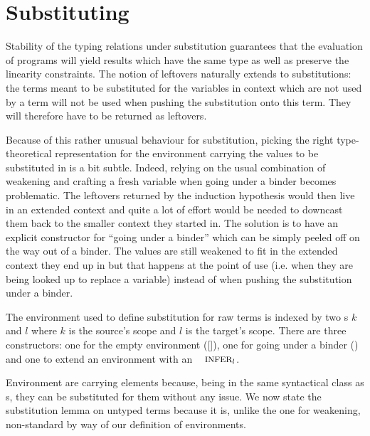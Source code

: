 \section{Substituting}\label{sec:substitution}

Stability of the typing relations under substitution guarantees
that the evaluation of programs will yield results which have
the same type as well as preserve the linearity constraints.
The notion of leftovers naturally extends to substitutions: the
terms meant to be substituted for the variables in context which
are not used by a term will not be used when pushing the substitution
onto this term. They will therefore have to be returned as leftovers.

Because of this rather unusual behaviour for substitution, picking
the right type-theoretical representation for the environment
carrying the values to be substituted in is a bit subtle. Indeed,
relying on the usual combination of weakening and crafting a fresh
variable when going under a binder becomes problematic. The leftovers
returned by the induction hypothesis would then live in an extended
context and quite a lot of effort would be needed to downcast them
back to the smaller context they started in. The solution is to have
an explicit constructor for ``going under a binder'' which can be
simply peeled off on the way out of a binder. The values are still
weakened to fit in the extended context they end up in but that happens
at the point of use (i.e. when they are being looked up to replace a
variable) instead of when pushing the substitution under a binder.


\begin{definition}The environment \Env{} used to define substitution
for raw terms is indexed by two \Nat{}s $k$ and $l$ where $k$ is the
source's scope and $l$ is the target's scope. There are three constructors:
one for the empty environment ([]), one for going under a binder (\envextend{})
and one to extend an environment with an $\Inferable{l}$.
\end{definition}

Environment are carrying \Inferable{} elements because, being in the
same syntactical class as \Var{}s, they can be substituted for them
without any issue. We now state the substitution lemma on untyped terms
because it is, unlike the one for weakening, non-standard by way of our
definition of environments.

